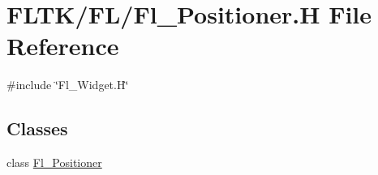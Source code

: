 \hypertarget{_fl___positioner_8_h}{}\section{F\+L\+T\+K/\+F\+L/\+Fl\+\_\+\+Positioner.H File Reference}
\label{_fl___positioner_8_h}
{\ttfamily \#include \char`\"{}Fl\+\_\+\+Widget.\+H\char`\"{}}\newline
\subsection*{Classes}
\begin{DoxyCompactItemize}
\item 
class \hyperlink{class_fl___positioner}{Fl\+\_\+\+Positioner}
\end{DoxyCompactItemize}
